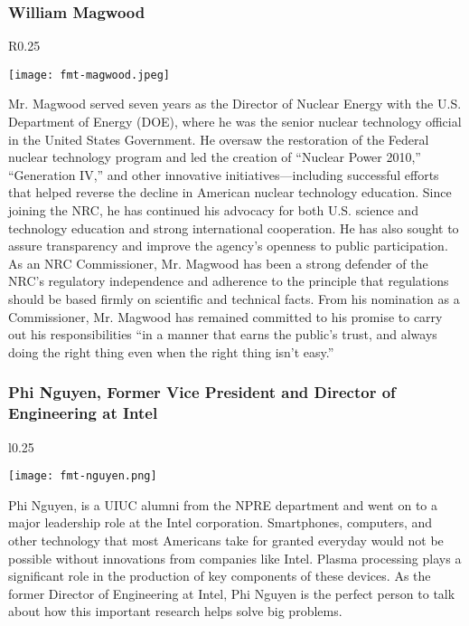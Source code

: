 \subsubsection{William Magwood}
\setlength\intextsep{0pt}
\begin{wrapfigure}{R}{0.25\textwidth}
	\begin{center}
		\texttt{[image: fmt-magwood.jpeg]}
	\end{center}
\end{wrapfigure}
Mr. Magwood served seven years as the Director of Nuclear Energy with the U.S. Department of Energy (DOE), where he was the senior nuclear technology official in the United States Government. He oversaw the restoration of the Federal nuclear technology program and led the creation of ``Nuclear Power 2010,'' ``Generation IV,'' and other innovative initiatives—including successful efforts that helped reverse the decline in American nuclear technology education. Since joining the NRC, he has continued his advocacy for both U.S. science and technology education and strong international cooperation. He has also sought to assure transparency and improve the agency's openness to public participation. As an NRC Commissioner, Mr. Magwood has been a strong defender of the NRC's regulatory independence and adherence to the principle that regulations should be based firmly on scientific and technical facts. From his nomination as a Commissioner, Mr. Magwood has remained committed to his promise to carry out his responsibilities ``in a manner that earns the public's trust, and always doing the right thing even when the right thing isn't easy.''

\subsubsection{Phi Nguyen, Former Vice President and Director of Engineering at Intel}
\setlength\intextsep{0pt}
\begin{wrapfigure}{l}{0.25\textwidth}
	\begin{center}
		\texttt{[image: fmt-nguyen.png]}
	\end{center}
\end{wrapfigure}
Phi Nguyen, is a UIUC alumni from the NPRE department and went on to a major leadership role at the Intel corporation. Smartphones, computers, and other technology that most Americans take for granted everyday would not be possible without innovations from companies like Intel. Plasma processing plays a significant role in the production of key components of these devices. As the former Director of Engineering at Intel, Phi Nguyen is the perfect person to talk about how this important research helps solve big problems. 
\clearpage

